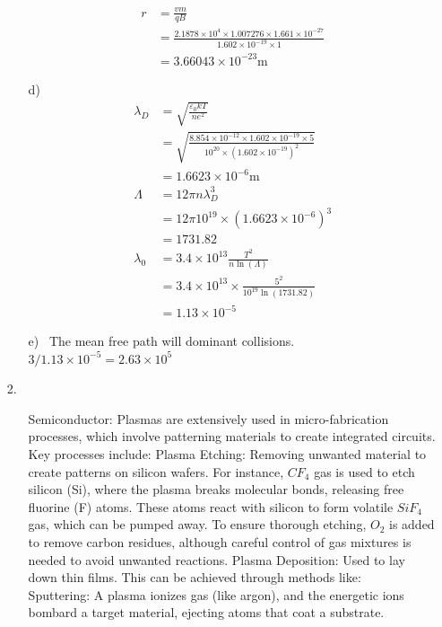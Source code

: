 \documentclass{article}
\begin{document}
\begin{itemize}
\begin{itemize}
\begin{align*}
            r &=\frac{vm}{qB} \\
            &=\frac{2.1878\times 10^{4}\times1.007276\times 1.661\times 10^{-27}}{1.602\times 10^{-19}\times 1}\\
            &=3.66043\times 10^{-23} \text{m}
        \end{align*}
        \item [d)]\
        \begin{align*}
            \lambda_D &= \sqrt{\frac{\varepsilon_0 kT}{ne^2}}\\
            &=\sqrt{\frac{8.854\times 10^{-12}\times 1.602\times 10^{-19}\times 5}{10^{20}\times (1.602\times 10^{-19})^2}}\\
            &=1.6623\times 10^{-6} \text{m}\\
            \Lambda  &=12\pi n \lambda_D^3\\
            &=12\pi 10^{19}\times(1.6623\times 10^{-6})^3\\
            &=1731.82\\
            \lambda_0 &=3.4\times 10^{13}\frac{T^2}{n\ln(\Lambda)}\\
            &=3.4\times 10^{13}\times \frac{5^2}{10^{19}\ln(1731.82)}\\
            &=1.13\times 10^{-5}
        \end{align*}
        \item [e)]\
        The mean free path will dominant collisions. \\ \(3/1.13\times 10^{-5} = 2.63\times 10^5\)
    \end{itemize}
    \item [2.]\
    \begin{itemize}
        \item [Semiconductor:]Plasmas are extensively used in micro-fabrication processes, which involve patterning materials to create integrated circuits. Key processes include:
        Plasma Etching: Removing unwanted material to create patterns on silicon wafers. For instance, \(CF_4\) gas is used to etch silicon (Si), where the plasma breaks molecular bonds, releasing free fluorine (F) atoms. These atoms react with silicon to form volatile 
        \(SiF_4\) gas, which can be pumped away. To ensure thorough etching, \(O_2\) is added to remove carbon residues, although careful control of gas mixtures is needed to avoid unwanted reactions.
        Plasma Deposition: Used to lay down thin films. This can be achieved through methods like:
        \\
        Sputtering: A plasma ionizes gas (like argon), and the energetic ions bombard a target material, ejecting atoms that coat a substrate.\\

\end{itemize}
\end{itemize}
\end{document}
